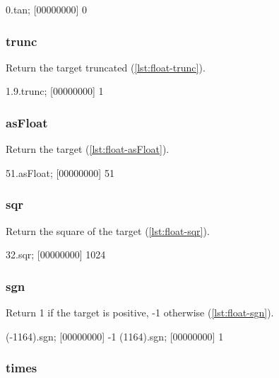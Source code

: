 \begin{urbiscript}[caption=Float.tan, label=lst:float-tan,
  float=\floatposh]
0.tan;
[00000000] 0
\end{urbiscript}

\subsubsection{trunc}

Return the target truncated  (\autoref{lst:float-trunc}).

\begin{urbiscript}[caption=Float.trunc, label=lst:float-trunc,
  float=\floatposh]
1.9.trunc;
[00000000] 1
\end{urbiscript}

\subsubsection{asFloat}

Return the target (\autoref{lst:float-asFloat}).

\begin{urbiscript}[caption=Float.asFloat, label=lst:float-asFloat,
  float=\floatposh]
51.asFloat;
[00000000] 51
\end{urbiscript}

\subsubsection{sqr}

Return the square of the target (\autoref{lst:float-sqr}).

\begin{urbiscript}[caption=Float.sqr, label=lst:float-sqr,
  float=\floatposh]
32.sqr;
[00000000] 1024
\end{urbiscript}

\subsubsection{sgn}

Return 1 if the target is positive, -1 otherwise (\autoref{lst:float-sgn}).

\begin{urbiscript}[caption=Float.sgn, label=lst:float-sgn,
  float=\floatposh]
(-1164).sgn;
[00000000] -1
(1164).sgn;
[00000000] 1
\end{urbiscript}

\subsubsection{times}

